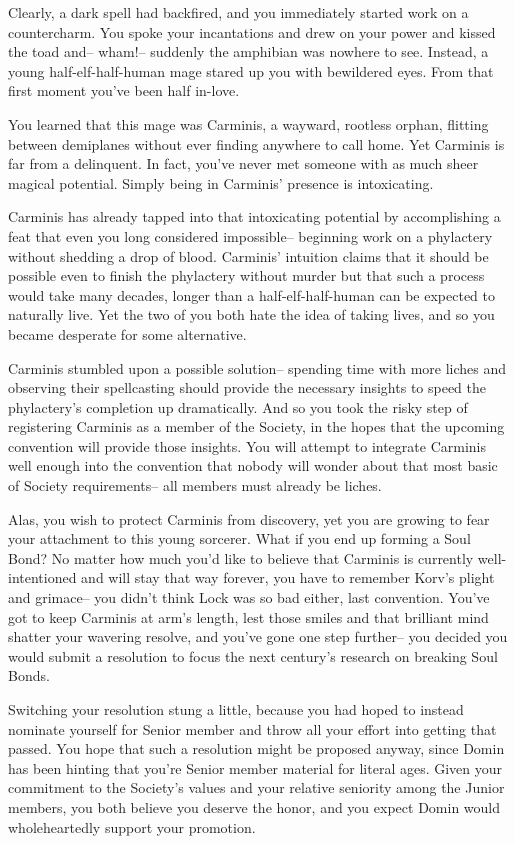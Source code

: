 \documentclass[char]{Sel}
\begin{document}
Clearly, a dark spell had backfired, and you immediately started work on a countercharm. You spoke your incantations and drew on your power and kissed the toad and-- wham!-- suddenly the amphibian was nowhere to see. Instead, a young half-elf-half-human mage stared up you with bewildered eyes. From that first moment you've been half in-love.

You learned that this mage was Carminis, a wayward, rootless orphan, flitting between demiplanes without ever finding anywhere to call home. Yet Carminis is far from a delinquent. In fact, you've never met someone with as much sheer magical potential. Simply being in Carminis' presence is intoxicating.

Carminis has already tapped into that intoxicating potential by accomplishing a feat that even you long considered impossible-- beginning work on a phylactery without shedding a drop of blood. Carminis' intuition claims that it should be possible even to finish the phylactery without murder but that such a process would take many decades, longer than a half-elf-half-human can be expected to naturally live. Yet the two of you both hate the idea of taking lives, and so you became desperate for some alternative.

Carminis stumbled upon a possible solution-- spending time with more liches and observing their spellcasting should provide the necessary insights to speed the phylactery's completion up dramatically. And so you took the risky step of registering Carminis as a member of the Society, in the hopes that the upcoming convention will provide those insights. You will attempt to integrate Carminis well enough into the convention that nobody will wonder about that most basic of Society requirements-- all members must already be liches.

Alas, you wish to protect Carminis from discovery, yet you are growing to fear your attachment to this young sorcerer. What if you end up forming a Soul Bond? No matter how much you'd like to believe that Carminis is currently well-intentioned and will stay that way forever, you have to remember Korv's plight and grimace-- you didn't think Lock was so bad either, last convention. You've got to keep Carminis at arm's length, lest those smiles and that brilliant mind shatter your wavering resolve, and you've gone one step further-- you decided you would submit a resolution to focus the next century's research on breaking Soul Bonds.

Switching your resolution stung a little, because you had hoped to instead nominate yourself for Senior member and throw all your effort into getting that passed. You hope that such a resolution might be proposed anyway, since Domin has been hinting that you're Senior member material for literal ages. Given your commitment to the Society's values and your relative seniority among the Junior members, you both believe you deserve the honor, and you expect Domin would wholeheartedly support your promotion.
\end{document}
